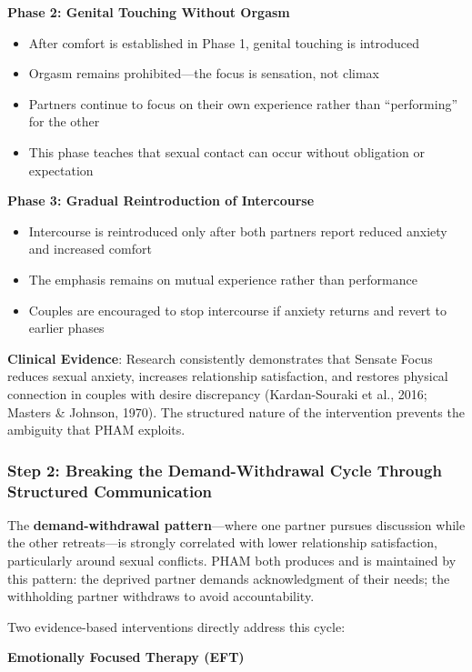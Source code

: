 \documentclass[12pt, letterpaper]{article}
\begin{document}
\textbf{Phase 2: Genital Touching Without Orgasm}
\begin{itemize}
    \item After comfort is established in Phase 1, genital touching is introduced
    \item Orgasm remains prohibited---the focus is sensation, not climax
    \item Partners continue to focus on their own experience rather than ``performing'' for the other
    \item This phase teaches that sexual contact can occur without obligation or expectation
\end{itemize}

\textbf{Phase 3: Gradual Reintroduction of Intercourse}
\begin{itemize}
    \item Intercourse is reintroduced only after both partners report reduced anxiety and increased comfort
    \item The emphasis remains on mutual experience rather than performance
    \item Couples are encouraged to stop intercourse if anxiety returns and revert to earlier phases
\end{itemize}

\textbf{Clinical Evidence}: Research consistently demonstrates that Sensate Focus reduces sexual anxiety, increases relationship satisfaction, and restores physical connection in couples with desire discrepancy (Kardan-Souraki et al., 2016; Masters \& Johnson, 1970). The structured nature of the intervention prevents the ambiguity that PHAM exploits.

\subsubsection{Step 2: Breaking the Demand-Withdrawal Cycle Through Structured Communication}

The \textbf{demand-withdrawal pattern}---where one partner pursues discussion while the other retreats---is strongly correlated with lower relationship satisfaction, particularly around sexual conflicts. PHAM both produces and is maintained by this pattern: the deprived partner demands acknowledgment of their needs; the withholding partner withdraws to avoid accountability.

Two evidence-based interventions directly address this cycle:

\textbf{Emotionally Focused Therapy (EFT)}
\end{document}
